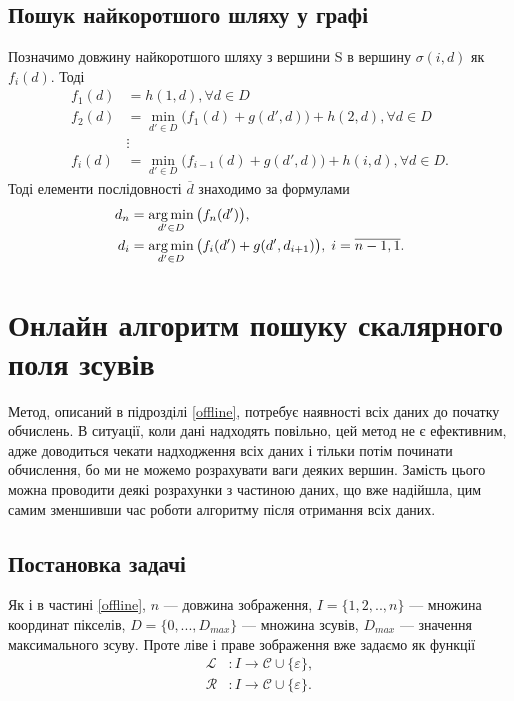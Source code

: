 \subsection{Пошук найкоротшого шляху у графі}
Позначимо довжину найкоротшого шляху з вершини S в вершину $ \sigma(i, d) $ як $ f_i (d) $. 
Тоді 
\begin{align*}
	f_1 (d) &= h(1, d),  \forall d \in D \\
	f_2 (d) &=  \min\limits_{d' \in D}\Big( f_1(d) + g(d', d) \Big) + h(2, d),  \forall d \in D \\
	&\vdots \\
	f_i (d) &= \min\limits_{d' \in D}\Big( f_{i-1}(d) + g(d', d) \Big) + h(i, d),  \forall d \in D .
\end{align*}
Тоді елементи послідовності $\overline{d}$ знаходимо за формулами
\begin{align*}
d_n &= \operatorname*{arg\,min}\limits_{d' \in D}{\big( f_n(d') \big)}, \\
d_i &= \operatorname*{arg\,min}\limits_{d' \in D}{\big( f_{i}(d') + g(d',d_{i+1})\big), \; i = \overline{n-1, 1}}.
\end{align*}
\newpage



\section{Онлайн алгоритм пошуку скалярного поля зсувів}
Метод, описаний в підрозділі \ref{offline}, потребує наявності всіх даних до початку обчислень. В ситуації, коли дані надходять повільно, цей метод не є ефективним, адже доводиться чекати надходження всіх даних і тільки потім починати обчислення, бо ми не можемо розрахувати ваги деяких вершин.
Замість цього можна проводити деякі розрахунки з частиною даних, що вже надійшла, цим самим зменшивши час роботи алгоритму після отримання всіх даних.

\subsection{Постановка задачі}
Як і в частині \ref{offline}, $n$ --- довжина зображення, $I = \{1, 2, .., n\}$ --- множина координат пікселів, $D = \{0, ... , D_{max}\}$ --- множина зсувів, $D_{max}$ --- значення максимального зсуву. 
Проте ліве і праве зображення вже задаємо як функції 
\begin{align*}
	\mathcal{L} &: I \rightarrow \mathcal{C} \cup \{ \varepsilon \}, \\
	\mathcal{R} &: I \rightarrow \mathcal{C} \cup \{ \varepsilon \}.
\end{align*}

